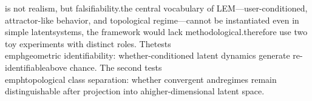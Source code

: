 \documentclass[11pt]{article}
\begin{document}
is not realism, but falsifiability.\nIf the central vocabulary of LEM---user-conditioned\ntrajectories, attractor-like behavior, and topological regime\nseparation---cannot be instantiated even in simple latent\ndynamical systems, the framework would lack methodological\ncredibility.\n\nWe therefore use two toy experiments with distinct roles. The\nfirst tests \\emph{geometric identifiability}: whether\nuser-conditioned latent dynamics generate re-identifiable\ntrajectories above chance. The second tests\n\\emph{topological class separation}: whether convergent and\ncyclic regimes remain distinguishable after projection into a\nnoisy higher-dimensional latent space.\n\n%
\end{document}
